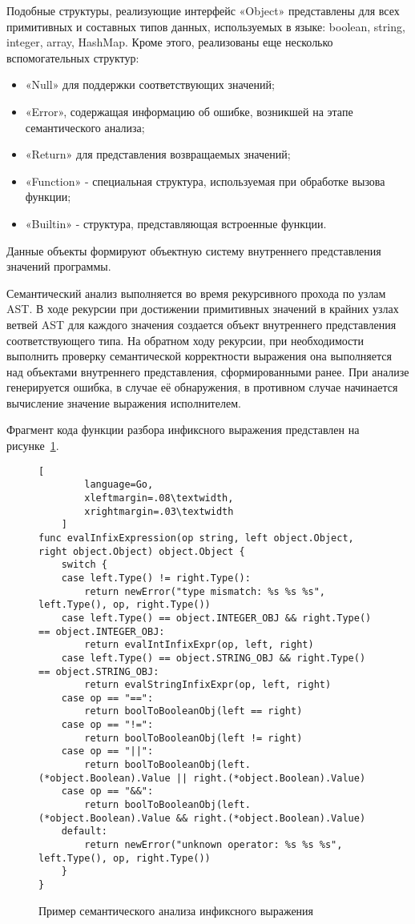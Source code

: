 Подобные структуры, реализующие интерфейс «Object» представлены для всех примитивных и составных типов данных, используемых в языке:
boolean, string, integer, array, HashMap.
Кроме этого, реализованы еще несколько вспомогательных структур:

\begin{itemize}
    \item «Null» для поддержки соответствующих значений;
    \item «Error», содержащая информацию об ошибке, возникшей на этапе семантического анализа;
    \item «Return» для представления возвращаемых значений;
    \item «Function» - специальная структура, используемая при обработке вызова функции;
    \item «Builtin» - структура, представляющая встроенные функции.
\end{itemize}

Данные объекты формируют объектную систему внутреннего представления значений программы.

Семантический анализ выполняется во время рекурсивного прохода по узлам AST.
В ходе рекурсии при достижении примитивных значений в крайних узлах ветвей AST для каждого значения создается объект  внутреннего представления соответствующего типа.
На обратном ходу рекурсии, при необходимости выполнить проверку семантической корректности выражения она выполняется над объектами внутреннего представления, сформированными ранее.
При анализе генерируется ошибка, в случае её обнаружения, в противном случае начинается вычисление значение выражения исполнителем.

Фрагмент кода функции разбора инфиксного выражения представлен на рисунке~\ref{f:code_semantic}.

\begin{figure}[ht]
	\centering
	\vspace{\toppaddingoffigure}
	\begin{lstlisting}[
        language=Go,
        xleftmargin=.08\textwidth,
        xrightmargin=.03\textwidth
    ]
func evalInfixExpression(op string, left object.Object, right object.Object) object.Object {
    switch {
    case left.Type() != right.Type():
        return newError("type mismatch: %s %s %s", left.Type(), op, right.Type())
    case left.Type() == object.INTEGER_OBJ && right.Type() == object.INTEGER_OBJ:
        return evalIntInfixExpr(op, left, right)
    case left.Type() == object.STRING_OBJ && right.Type() == object.STRING_OBJ:
        return evalStringInfixExpr(op, left, right)
    case op == "==":
        return boolToBooleanObj(left == right)
    case op == "!=":
        return boolToBooleanObj(left != right)
    case op == "||":
        return boolToBooleanObj(left.(*object.Boolean).Value || right.(*object.Boolean).Value)
    case op == "&&":
        return boolToBooleanObj(left.(*object.Boolean).Value && right.(*object.Boolean).Value)
    default:
        return newError("unknown operator: %s %s %s", left.Type(), op, right.Type())
    }
}
\end{lstlisting}
	\caption{Пример семантического анализа инфиксного выражения}
	\label{f:code_semantic}
\end{figure}